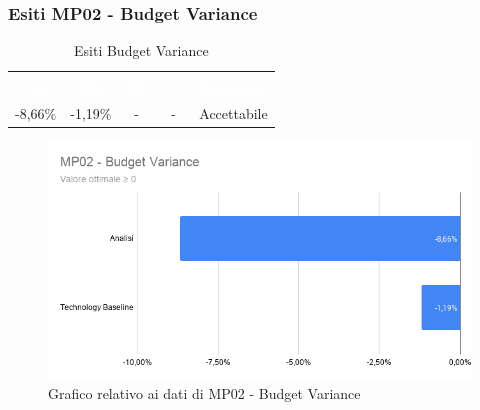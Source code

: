 \subsubsection{Esiti MP02 - Budget Variance}
\begin{longtable}{c c c c c}
\rowcolor{white}\caption{Esiti Budget Variance} \\
		\rowcolor{redafk}
\textcolor{white}{\textbf{An}} &
\textcolor{white}{\textbf{TB}} &
\textcolor{white}{\textbf{PB}} &
\textcolor{white}{\textbf{VC}} &
\textcolor{white}{\textbf{Riscontro}} \\
-8,66$\%$ &
-1,19$\%$ &
- &
- &
Accettabile \\
\end{longtable}

\begin{figure}[H]
\centering
\includegraphics[scale=0.5]{./img/MP02_budget_variance.png}
\caption{Grafico relativo ai dati di MP02 - Budget Variance}
\end{figure}

